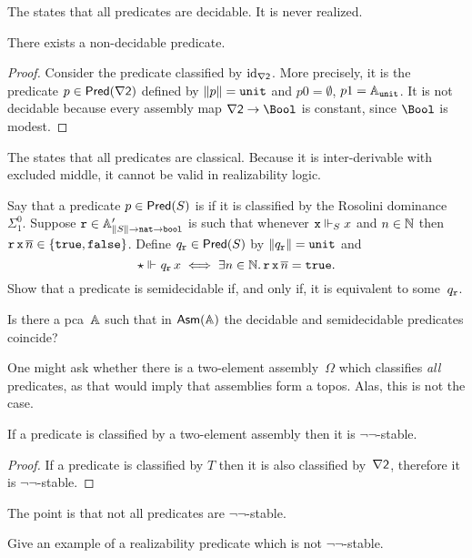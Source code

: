 The  states that all predicates are decidable. It is never realized.

\begin{proposition}
  There exists a non-decidable predicate.
\end{proposition}

\begin{proof}
  Consider the predicate classified by $\id[\nabla \two]$.
  More precisely, it is the predicate $p \in \Pred{\nabla \two}$ defined by
  $\T{p} = \unit$ and $p 0 = \emptyset$, $p 1 = \Atyp{\unit}$.
  It is not decidable because every assembly map $\nabla \two \to \Bool$ is constant, since $\Bool$ is modest.
\end{proof}

The  states that all predicates are classical. Because it is inter-derivable with excluded middle, it cannot be valid in realizability logic.

\begin{exercise}
  Say that a predicate $p \in \Pred{S}$ is  if it is classified by the Rosolini dominance $\Sigma^0_1$. 
  Suppose $\R{r} \in \subAtyp{\T{S} \to \ttnat \to \ttbool}$ is such that
  whenever $\R{x} \rz[S] x$ and $n \in \NN$ then $\R{r}\,\R{x}\,\overline{n} \in \set{\combTrue, \combFalse}$. Define $q_{\R{r}} \in \Pred{S}$ by $\T{q_{\R{r}}} = \unit$ and
  \begin{equation*}
    \ttunit \rz q_{\R{r}}\,x
    \iff \some{n \in \NN} \R{r}\,\R{x}\,\overline{n} = \combTrue.
  \end{equation*}
  Show that a predicate is semidecidable if, and only if, it is equivalent to some~$q_{\R{r}}$.
\end{exercise}

\begin{exercise}
  Is there a pca~$\AA$ such that in $\Asm{\AA}$ the decidable and semidecidable predicates coincide?
\end{exercise}

One might ask whether there is a two-element assembly~$\Omega$ which classifies \emph{all} predicates, as that would imply that assemblies form a topos. Alas, this is not the case.

\begin{proposition}
  If a predicate is classified by a two-element assembly then it is $\lnot\lnot$-stable.
\end{proposition}

\begin{proof}
  If a predicate is classified by $T$ then it is also classified by~$\nabla \two$, therefore it is $\lnot\lnot$-stable.
\end{proof}

The point is that not all predicates are $\lnot\lnot$-stable.

\begin{exercise}
  Give an example of a realizability predicate which is not $\lnot\lnot$-stable.
\end{exercise}




